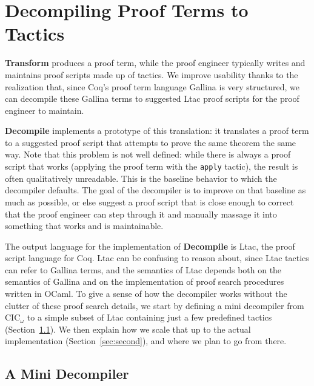 \section{Decompiling Proof Terms to Tactics}
\label{sec:decompiler}

\textbf{Transform} produces a proof term,
while the proof engineer typically writes and maintains proof scripts made up of tactics.
We improve usability thanks to the realization that, since Coq's proof term language Gallina is very structured,
we can decompile these Gallina terms to suggested Ltac proof scripts for the proof engineer to maintain.


\textbf{Decompile} implements a prototype of this translation:
it translates a proof term to a suggested proof script that attempts to prove the same theorem the same way.
Note that this problem is not well defined: while there is always a proof script that 
works (applying the proof term with the \lstinline{apply} tactic), the result is often qualitatively unreadable.
This is the baseline behavior to which the decompiler defaults.
The goal of the decompiler is to improve on that baseline as much as possible,
or else suggest a proof script that is close enough to correct that the proof engineer can step through it
and manually massage it into something that works and is maintainable.

The output language for the implementation of \textbf{Decompile} is Ltac, the proof script language for Coq.
Ltac can be confusing to reason about, since Ltac tactics can refer to Gallina terms, and the semantics of Ltac depends both on the
semantics of Gallina and on the implementation of proof search procedures written in OCaml.
To give a sense of how the decompiler works without the clutter of these proof search details, we start by defining a mini
decompiler from CIC$_{\omega}$ to a simple subset of Ltac containing just a few predefined tactics (Section~\ref{sec:first}).
We then explain how we scale that up to the actual implementation (Section~\ref{sec:second}), and where we plan to go from there.

\subsection{A Mini Decompiler}
\label{sec:first}


